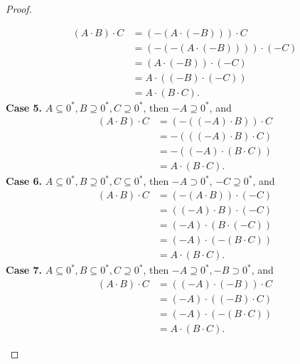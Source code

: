 \begin{proof}
\begin{enumerate}[label={(F\arabic*)}, start=5]
\begin{align*}
                  (A\cdot B)\cdot C & = (-(A\cdot (-B)))\cdot C       \\
                                    & = (-(-(A\cdot (-B))))\cdot (-C) \\
                                    & = (A\cdot (-B))\cdot (-C)       \\
                                    & = A\cdot ((-B)\cdot (-C))       \\
                                    & = A\cdot (B\cdot C).
              \end{align*}
              \textbf{Case 5.} $A\subseteq {0}^{*}, B\supseteq {0}^{*}, C\supseteq {0}^{*}$, then $-A\supseteq {0}^{*}$, and
              \begin{align*}
                  (A\cdot B)\cdot C & = (-((-A)\cdot B))\cdot C \\
                                    & = -(((-A)\cdot B)\cdot C) \\
                                    & = -((-A)\cdot (B\cdot C)) \\
                                    & = A\cdot (B\cdot C).
              \end{align*}
              \textbf{Case 6.} $A\subseteq {0}^{*}, B\supseteq {0}^{*}, C\subseteq {0}^{*}$, then $-A\supset {0}^{*}$, $-C\supseteq {0}^{*}$, and
              \begin{align*}
                  (A\cdot B)\cdot C & = (-(A\cdot B))\cdot (-C) \\
                                    & = ((-A)\cdot B)\cdot (-C) \\
                                    & = (-A)\cdot (B\cdot (-C)) \\
                                    & = (-A)\cdot (-(B\cdot C)) \\
                                    & = A\cdot (B\cdot C).
              \end{align*}
              \textbf{Case 7.} $A\subseteq {0}^{*}, B\subseteq {0}^{*}, C\supseteq {0}^{*}$, then $-A\supseteq {0}^{*}, -B\supset {0}^{*}$, and
              \begin{align*}
                  (A\cdot B)\cdot C & = ((-A)\cdot (-B))\cdot C \\
                                    & = (-A)\cdot ((-B)\cdot C) \\
                                    & = (-A)\cdot (-(B\cdot C)) \\
                                    & = A\cdot (B\cdot C).
              \end{align*}

\end{enumerate}
\end{proof}
